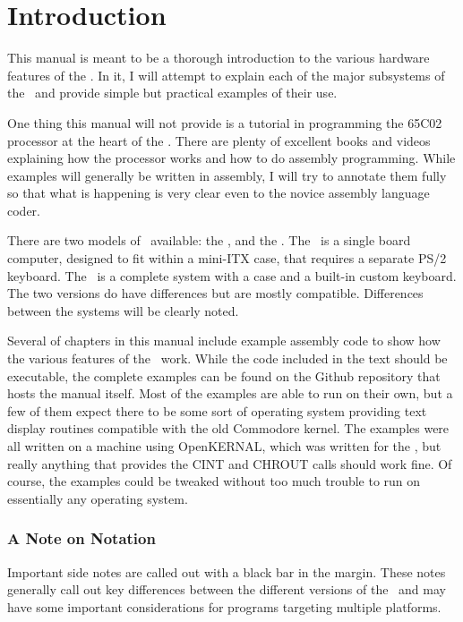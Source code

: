\chapter{Introduction}

This manual is meant to be a thorough introduction to the various hardware features of the \jr. In it, I will attempt to explain each of the major subsystems of the \jr\ and provide simple but practical examples of their use.

One thing this manual will not provide is a tutorial in programming the 65C02 processor at the heart of the \jr. There are plenty of excellent books and videos explaining how the processor works and how to do assembly programming. While examples will generally be written in assembly, I will try to annotate them fully so that what is happening is very clear even to the novice assembly language coder.

There are two models of \jr\ available: the \fjr, and the \fk. The \fjr\ is a single board computer, designed to fit within a mini-ITX case, that requires a separate PS/2 keyboard. The \fk\ is a complete system with a case and a built-in custom keyboard. The two versions do have differences but are mostly compatible. Differences between the systems will be clearly noted.

Several of chapters in this manual include example assembly code to show how the various features of the \jr\ work. While the code included in the text should be executable, the complete examples can be found on the Github repository that hosts the manual itself. Most of the examples are able to run on their own, but a few of them expect there to be some sort of operating system providing text display routines compatible with the old Commodore kernel. The examples were all written on a machine using OpenKERNAL, which was written for the \jr, but really anything that provides the CINT and CHROUT calls should work fine. Of course, the examples could be tweaked without too much trouble to run on essentially any operating system.

\subsection*{A Note on Notation}

Important side notes are called out with a black bar in the margin. These notes generally call out key differences between the different versions of the \jr\ and may have some important considerations for programs targeting multiple platforms.

